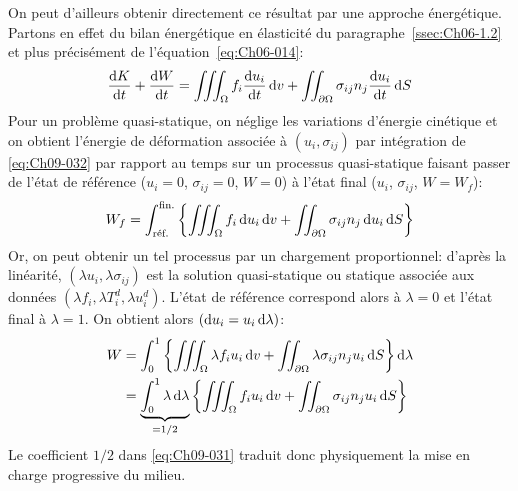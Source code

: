 On peut d'ailleurs obtenir directement ce résultat par une approche énergétique.
Partons en effet du bilan énergétique en élasticité du paragraphe~\ref{ssec:Ch06-1.2} et plus précisément de l'équation~\eqref{eq:Ch06-014}:
\begin{equation}
    \frac{\mathop{\mathrm{{}d}}\mathopen{} K}{\mathop{\mathrm{{}d}}\mathopen{} t} + \frac{\mathop{\mathrm{{}d}}\mathopen{} W}{\mathop{\mathrm{{}d}}\mathopen{} t} = \iiint_{\Omega} f_i \frac{\mathop{\mathrm{{}d}}\mathopen{} u_i}{\mathop{\mathrm{{}d}}\mathopen{} t} \mathop{\mathrm{{}d}}\mathopen{} v + \iint_{\partial \Omega} \sigma_{ij} n_j \frac{\mathop{\mathrm{{}d}}\mathopen{} u_i}{\mathop{\mathrm{{}d}}\mathopen{} t} \mathop{\mathrm{{}d}}\mathopen{} S
    \label{eq:Ch09-032}
\end{equation}
Pour un problème quasi-statique, on néglige les variations d'énergie cinétique et on obtient l'énergie de déformation associée à $\left( u_i, \sigma_{ij} \right)$ par intégration de \eqref{eq:Ch09-032} par rapport au temps sur un processus quasi-statique faisant passer de l'état de référence ($u_i=0$, $\sigma_{ij} = 0$, $W=0$) à l'état final ($u_i$, $\sigma_{ij}$, $W=W_f$):
\begin{displaymath}
    W_f = \int_{\text{réf.}}^{\text{fin.}} \left\{ \iiint_{\Omega} f_i \mathop{\mathrm{{}d}}\mathopen{} u_i \mathop{\mathrm{{}d}}\mathopen{} v + \iint_{\partial \Omega} \sigma_{ij} n_j \mathop{\mathrm{{}d}}\mathopen{} u_i \mathop{\mathrm{{}d}}\mathopen{} S \right\}
\end{displaymath}
Or, on peut obtenir un tel processus par un chargement proportionnel: d'après la linéarité, $\left( \lambda u_i, \lambda \sigma_{ij} \right)$ est la solution quasi-statique ou statique associée aux données $\left( \lambda f_i, \lambda T_i^d, \lambda u_i^d \right)$.
L'état de référence correspond alors à $\lambda=0$ et l'état  final à $\lambda=1$.
On  obtient alors $\left( \mathop{\mathrm{{}d}}\mathopen{} u_i = u_i \mathop{\mathrm{{}d}}\mathopen{} \lambda \right)$:
\begin{align*}
    W &= \int_{0}^1 \left\{ \iiint_{\Omega} \lambda f_i u_i \mathop{\mathrm{{}d}}\mathopen{} v + \iint_{\partial \Omega} \lambda \sigma_{ij} n_j u_i \mathop{\mathrm{{}d}}\mathopen{} S \right\} \mathop{\mathrm{{}d}}\mathopen{} \lambda \\
    &= \underbrace{\int_0^1 \lambda \mathop{\mathrm{{}d}}\mathopen{} \lambda}_{=1/2} \left\{ \iiint_{\Omega} f_i u_i \mathop{\mathrm{{}d}}\mathopen{} v + \iint_{\partial \Omega} \sigma_{ij} n_j u_i \mathop{\mathrm{{}d}}\mathopen{} S \right\}
\end{align*}
Le coefficient $1/2$ dans \eqref{eq:Ch09-031} traduit donc physiquement la mise en charge progressive du milieu. 

